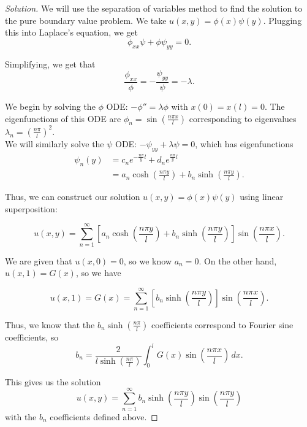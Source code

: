 \documentclass[11pt]{article}
\newenvironment{solution}
  {\renewcommand\qedsymbol{$\blacksquare$}\begin{proof}[Solution]}
  {\end{proof}}
\begin{document}
\begin{solution}
We will use the separation of variables method to find the solution to the pure boundary value problem. We take $u(x, y) = \phi(x)\psi(y).$ Plugging this into Laplace's equation, we get
\[ \phi_{xx} \psi + \phi \psi_{yy} = 0.\]

Simplifying, we get that \[ \frac{\phi_{xx}}{\phi} = -\frac{\psi_{yy}}{\psi} = -\lambda. \]

We begin by solving the $\phi$ ODE: $-\phi''=\lambda \phi$ with $x(0) = x(l) = 0$. The eigenfunctions of this ODE are $\phi_n = \sin\left(\frac{n\pi x}{l}\right)$ corresponding to eigenvalues $\lambda_n = \left(\frac{n\pi}{l}\right)^2.$ \\

We will similarly solve the $\psi$ ODE: $-\psi_{yy} + \lambda\psi = 0$, which has eigenfunctions \begin{align*}\psi_n(y) &= c_n e^{-\frac{n\pi}{y}l} + d_n e^{\frac{n\pi}{y}l} \\ 
&= a_n \cosh \left( \frac{n\pi y}{l}\right) + b_n \sinh \left( \frac{n\pi y}{l}\right).\end{align*}

Thus, we can construct our solution $u(x, y) = \phi(x)\psi(y)$ using linear superposition:

\[ u(x, y) = \sum\limits_{n=1}^{\infty} \left[a_n \cosh \left( \frac{n\pi y}{l}\right) + b_n \sinh \left( \frac{n\pi y}{l}\right)\right] \sin\left(\frac{n\pi x}{l}\right). \]

We are given that $u(x, 0) = 0$, so we know $a_n = 0$. On the other hand, $u(x, 1) = G(x)$, so we have

\[ u(x, 1) = G(x) = \sum\limits_{n=1}^{\infty} \left[b_n \sinh \left( \frac{n\pi y}{l}\right)\right] \sin\left(\frac{n\pi x}{l}\right). \]

Thus, we know that the $b_n \sinh\left( \frac{n\pi}{l}\right)$ coefficients correspond to Fourier sine coefficients, so \[b_n = \frac{2}{l \sinh \left( \frac{n\pi}{l}\right)} \int_0^l G(x) \sin\left(\frac{n\pi x}{l} \right) \, dx. \]

This gives us the solution 
\[ \boxed{u(x, y) = \sum\limits_{n=1}^{\infty} b_n\sinh\left(\frac{n\pi y}{l}\right) \sin\left(\frac{n\pi y}{l}\right)} \] with the $b_n$ coefficients defined above.

\end{solution}
\end{document}
